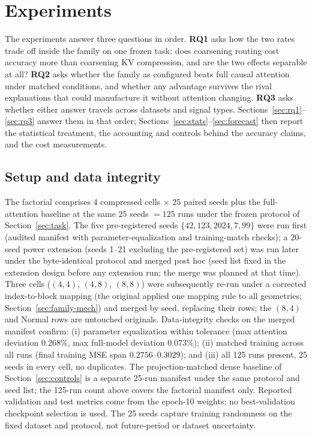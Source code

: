 \section{Experiments}
\label{sec:experiments}

The experiments answer three questions in order. \textbf{RQ1} asks how the two
rates trade off inside the family on one frozen task: does coarsening routing
cost accuracy more than coarsening KV compression, and are the two effects
separable at all? \textbf{RQ2} asks whether the family as configured beats full
causal attention under matched conditions, and whether any advantage survives
the rival explanations that could manufacture it without attention changing.
\textbf{RQ3} asks whether either answer travels across datasets and signal
types. Sections~\ref{sec:rq1}--\ref{sec:rq3} answer them in that order;
Sections~\ref{sec:stats}--\ref{sec:forecast} then report the statistical
treatment, the accounting and controls behind the accuracy claims, and the cost
measurements.

\subsection{Setup and data integrity}
The factorial comprises $4$ compressed cells $\times$ $25$ paired seeds plus
the full-attention baseline at the same $25$ seeds $= 125$ runs under the
frozen protocol of Section~\ref{sec:task}. The five pre-registered seeds
$\{42, 123, 2024, 7, 99\}$ were run first (audited manifest with
parameter-equalization and training-match checks); a 20-seed power extension
(seeds 1--21 excluding the pre-registered set) was run later under the
byte-identical protocol and merged post hoc (seed list fixed in the extension design before any extension run; the merge was planned at that time). Three cells ($(4,4)$, $(4,8)$, $(8,8)$)
were subsequently re-run under a corrected index-to-block mapping (the original applied
one mapping rule to all geometries; Section~\ref{sec:family-mech}) and merged by seed,
replacing their rows; the $(8,4)$ and Normal rows are untouched originals. Data-integrity checks on the
merged manifest confirm: (i) parameter equalization within tolerance
(max attention deviation $0.268\%$, max full-model deviation $0.073\%$);
(ii) matched training across all runs (final training MSE span
$0.2756$--$0.3029$); and (iii) all 125 runs present, 25 seeds in every
cell, no duplicates. The projection-matched dense baseline of
Section~\ref{sec:controls} is a separate 25-run manifest under the same protocol
and seed list; the 125-run count above covers the factorial manifest only.
Reported validation and test metrics come from the
epoch-10 weights; no best-validation checkpoint selection is used. The 25 seeds capture training randomness on the fixed dataset and protocol, not future-period or dataset uncertainty.

